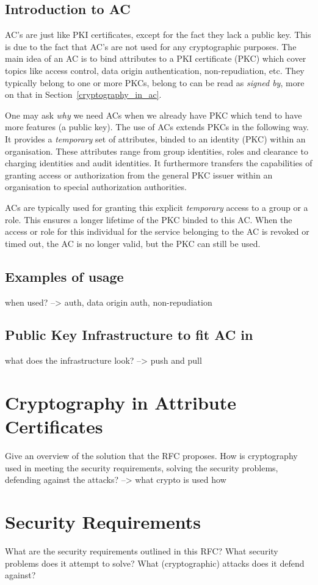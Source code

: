 \documentclass[10pt,conference,a4paper]{IEEEtran}
\begin{document}
\subsection{Introduction to AC}
AC's are just like PKI certificates, except for the fact they lack a public key. This is due to the fact that AC's are not used for any cryptographic purposes. The main idea of an AC is to bind attributes to a PKI certificate (PKC) which cover topics like access control, data origin authentication, non-repudiation, etc. They typically belong to one or more PKCs, belong to can be read as \textit{signed by}, more on that in Section~\ref{cryptography_in_ac}.

One may ask \textit{why} we need ACs when we already have PKC which tend to have more features (a public key). The use of ACs extends PKCs in the following way. It provides a \textit{temporary} set of attributes, binded to an identity (PKC) within an organisation. These attributes range from group identities, roles and clearance to charging identities and audit identities. It furthermore transfers the capabilities of granting access or authorization from the general PKC issuer within an organisation to special authorization authorities.

ACs are typically used for granting this explicit \textit{temporary} access to a group or a role. This ensures a longer lifetime of the PKC binded to this AC. When the access or role for this individual for the service belonging to the AC is revoked or timed out, the AC is no longer valid, but the PKC can still be used.

\subsection{Examples of usage}
when used? --> auth, data origin auth, non-repudiation
\subsection{Public Key Infrastructure to fit AC in}
what does the infrastructure look? --> push and pull

\label{cryptography_in_ac}
\section{Cryptography in Attribute Certificates}
Give an overview of the solution that the RFC proposes. How is cryptography used in meeting the security requirements, solving the security problems, defending against the attacks?
--> what crypto is used how

\label{security_requirements}
\section{Security Requirements}
What are the security requirements outlined in this RFC? What security problems does it attempt to solve? What (cryptographic) attacks does it defend against?



\end{document}
